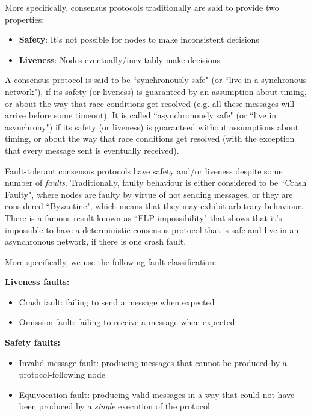 \documentclass{article}
\theoremstyle{definition}
\begin{document}
More specifically, consensus protocols traditionally are said to provide two properties:
\begin{itemize}
\item \textbf{Safety}: It's not possible for nodes to make inconsistent decisions
\item \textbf{Liveness}: Nodes eventually/inevitably make decisions
\end{itemize}

A consensus protocol is said to be ``synchronously safe" (or ``live in a synchronous network"), if its safety (or liveness) is guaranteed by an assumption about timing, or about the way that race conditions get resolved (e.g. all these messages will arrive before some timeout). It is called ``asynchronously safe" (or ``live in asynchrony") if its safety (or liveness) is guaranteed without assumptions about timing, or about the way that race conditions get resolved (with the exception that every message sent is eventually received).

Fault-tolerant consensus protocols have safety and/or liveness despite some number of \emph{faults}. Traditionally, faulty behaviour is either considered to be ``Crash Faulty", where nodes are faulty by virtue of not sending messages, or they are considered ``Byzantine", which means that they may exhibit arbitrary behaviour. There is a famous result known as ``FLP impossibility" \cite{Fischer_Lynch_Paterson_FLP_Impossibility_1985} that shows that it's impossible to have a deterministic consensus protocol that is safe and live in an asynchronous network, if there is one crash fault.

More specifically, we use the following fault classification:

\textbf{Liveness faults:}
\begin{itemize}
\item Crash fault: failing to send a message when expected
\item Omission fault: failing to receive a message when expected
\end{itemize}
\textbf{Safety faults:}
\begin{itemize}
\item Invalid message fault: producing messages that cannot be produced by a protocol-following node
\item Equivocation fault: producing valid messages in a way that could not have been produced by a \emph{single} execution of the protocol
\end{itemize}
\end{document}
